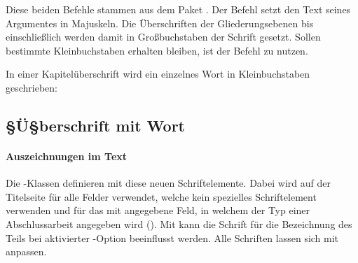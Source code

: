 \begin{Declaration}{}%
\begin{Declaration}{}%
\printdeclarationlist%
%
%
Diese beiden Befehle stammen aus dem Paket . Der Befehl 
 setzt den Text seines Argumentes in Majuskeln. Die 
Überschriften der Gliederungsebenen bis einschließlich  
werden damit in Großbuchstaben der Schrift \DIN gesetzt. Sollen bestimmte 
Kleinbuchstaben erhalten bleiben, ist der Befehl  zu nutzen.
\end{Declaration}
\end{Declaration}
%
\begin{Example}
In einer Kapitelüberschrift wird ein einzelnes Wort in Kleinbuchstaben 
geschrieben:
\begin{Code}[escapechar=§]
\chapter{§Ü§berschrift mit  Wort}
\end{Code}
\end{Example}

\subsubsection{Auszeichnungen im Text}
\begin{Declaration}[v2.02]{}
\begin{Declaration}[v2.02]{}
\begin{Declaration}[v2.02]{}
\printdeclarationlist%
%
Die \TUDScript-Klassen definieren mit  diese neuen 
Schriftelemente. Dabei wird  auf der Titelseite für alle 
Felder verwendet, welche kein spezielles Schriftelement verwenden und 
 für das mit  angegebene Feld, in welchem der Typ 
einer Abschlussarbeit angegeben wird (). Mit 
 kann die Schrift für die Bezeichnung des Teils bei 
aktivierter -Option beeinflusst werden. Alle Schriften lassen 
sich mit  anpassen.
\end{Declaration}
\end{Declaration}
\end{Declaration}

